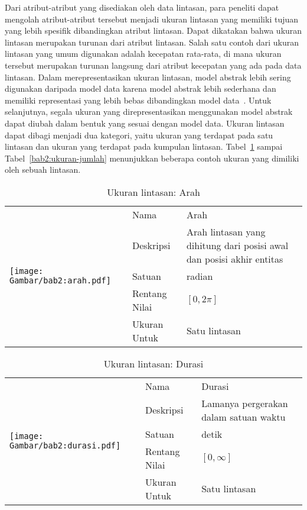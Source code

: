 Dari atribut-atribut yang disediakan oleh data lintasan, para peneliti dapat mengolah atribut-atribut tersebut menjadi ukuran lintasan yang memiliki tujuan yang lebih spesifik dibandingkan atribut lintasan. Dapat dikatakan bahwa ukuran lintasan merupakan turunan dari atribut lintasan. Salah satu contoh dari ukuran lintasan yang umum digunakan adalah kecepatan rata-rata, di mana ukuran tersebut merupakan turunan langsung dari atribut kecepatan yang ada pada data lintasan. Dalam merepresentasikan ukuran lintasan, model abstrak lebih sering digunakan daripada model data karena model abstrak lebih sederhana dan memiliki representasi yang lebih bebas dibandingkan model data~\cite{wiratma:trajectory}. Untuk selanjutnya, segala ukuran yang direpresentasikan menggunakan model abstrak dapat diubah dalam bentuk yang sesuai dengan model data. Ukuran lintasan dapat dibagi menjadi dua kategori, yaitu ukuran yang terdapat pada satu lintasan dan ukuran yang terdapat pada kumpulan lintasan. Tabel~\ref{bab2:ukuran-arah} sampai Tabel~\ref{bab2:ukuran-jumlah} menunjukkan beberapa contoh ukuran yang dimiliki oleh sebuah lintasan.

\begin{table}[h!]
    \centering
    \caption{Ukuran lintasan: Arah}
    \begin{tabular}{|m{4cm}|l|p{8.5cm}|} 
        \hline
        \multirow{5}{*}{
            \texttt{[image: Gambar/bab2:arah.pdf]}
        } & Nama & Arah \\ 
        \cline{2-3}
        & Deskripsi & Arah lintasan yang dihitung dari posisi awal dan posisi akhir entitas                    \\ 
        \cline{2-3}
        & Satuan & radian                    \\ 
        \cline{2-3}
        & Rentang Nilai & $[0, 2\pi]$                    \\ 
        \cline{2-3}
        & Ukuran Untuk & Satu lintasan                    \\
        \hline
    \end{tabular}
    \label{bab2:ukuran-arah}
\end{table}

\begin{table}[h!]
    \centering
    \caption{Ukuran lintasan: Durasi}
    \begin{tabular}{|m{4cm}|l|p{8.5cm}|} 
        \hline
        \multirow{5}{*}{
            \texttt{[image: Gambar/bab2:durasi.pdf]}
        } & Nama & Durasi \\ 
        \cline{2-3}
        & Deskripsi & Lamanya pergerakan dalam satuan waktu                    \\ 
        \cline{2-3}
        & Satuan & detik                    \\ 
        \cline{2-3}
        & Rentang Nilai & $[0, \infty]$                    \\ 
        \cline{2-3}
        & Ukuran Untuk & Satu lintasan                    \\
        \hline
    \end{tabular}
    \label{bab2:ukuran-durasi}
\end{table}

